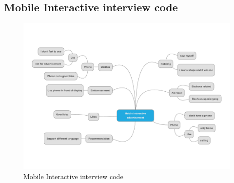 \begin{appendices}
\section{Mobile Interactive interview code}
\begin{minipage}{1.14\textwidth}
\begin{flushleft} 
\begin{figure}[H]
 \centering 
    \includegraphics[width = \textwidth, height=0.8\textheight]{Appendices/8/mobile-interactive/mobile-Interactive_code.pdf}
    \caption{Mobile Interactive interview code}
     \label{app:mobile-interactiveinterviewcode_}%
\end{figure}
\end{flushleft} 
\end{minipage}


\end{appendices}
